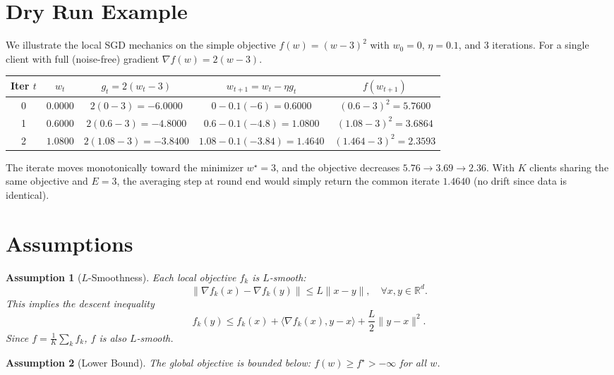 \documentclass[11pt]{article}
\newtheorem{assumption}{Assumption}
\begin{document}
\section*{Dry Run Example}

We illustrate the local SGD mechanics on the simple objective
$f(w) = (w-3)^2$ with $w_0 = 0$, $\eta = 0.1$, and $3$ iterations.
For a single client with full (noise-free) gradient
$\nabla f(w) = 2(w-3)$.

\begin{center}
\begin{tabular}{c|c|c|c|c}
Iter $t$ & $w_t$ & $g_t = 2(w_t - 3)$ & $w_{t+1} = w_t - \eta g_t$ & $f(w_{t+1})$\\
\hline
0 & $0.0000$ & $2(0-3) = -6.0000$ & $0 - 0.1(-6) = 0.6000$ & $(0.6-3)^2 = 5.7600$\\
1 & $0.6000$ & $2(0.6-3) = -4.8000$ & $0.6 - 0.1(-4.8) = 1.0800$ & $(1.08-3)^2 = 3.6864$\\
2 & $1.0800$ & $2(1.08-3) = -3.8400$ & $1.08 - 0.1(-3.84) = 1.4640$ & $(1.464-3)^2 = 2.3593$\\
\end{tabular}
\end{center}

The iterate moves monotonically toward the minimizer $w^\star = 3$, and the
objective decreases $5.76 \to 3.69 \to 2.36$. With $K$ clients sharing the
same objective and $E=3$, the averaging step at round end would simply return
the common iterate $1.4640$ (no drift since data is identical).

\section*{Assumptions}

\begin{assumption}[$L$-Smoothness]\label{a:smooth}
Each local objective $f_k$ is $L$-smooth:
\[
\|\nabla f_k(x) - \nabla f_k(y)\| \le L\|x - y\|,
\quad \forall x,y \in \mathbb{R}^d.
\]
This implies the descent inequality
\[
f_k(y) \le f_k(x) + \langle \nabla f_k(x), y - x\rangle
        + \frac{L}{2}\|y-x\|^2.
\]
Since $f=\frac1K\sum_k f_k$, $f$ is also $L$-smooth.
\end{assumption}

\begin{assumption}[Lower Bound]\label{a:lb}
The global objective is bounded below:
$f(w) \ge f^\star > -\infty$ for all $w$.
\end{assumption}
\end{document}
